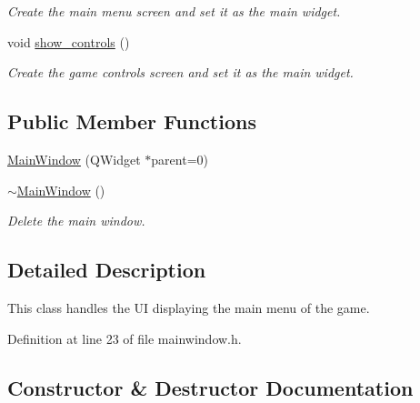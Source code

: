 \begin{DoxyCompactItemize}
\begin{DoxyCompactList}\small\item\em Create the main menu screen and set it as the main widget. \end{DoxyCompactList}\item 
void \hyperlink{class_main_window_a565aac1b17c3810913270d503d94b983}{show\+\_\+controls} ()\hypertarget{class_main_window_a565aac1b17c3810913270d503d94b983}{}\label{class_main_window_a565aac1b17c3810913270d503d94b983}

\begin{DoxyCompactList}\small\item\em Create the game controls screen and set it as the main widget. \end{DoxyCompactList}\end{DoxyCompactItemize}
\subsection*{Public Member Functions}
\begin{DoxyCompactItemize}
\item 
\hyperlink{class_main_window_a8b244be8b7b7db1b08de2a2acb9409db}{Main\+Window} (Q\+Widget $\ast$parent=0)
\item 
\hyperlink{class_main_window_ae98d00a93bc118200eeef9f9bba1dba7}{$\sim$\+Main\+Window} ()\hypertarget{class_main_window_ae98d00a93bc118200eeef9f9bba1dba7}{}\label{class_main_window_ae98d00a93bc118200eeef9f9bba1dba7}

\begin{DoxyCompactList}\small\item\em Delete the main window. \end{DoxyCompactList}\end{DoxyCompactItemize}


\subsection{Detailed Description}
This class handles the UI displaying the main menu of the game. 

Definition at line 23 of file mainwindow.\+h.



\subsection{Constructor \& Destructor Documentation}
